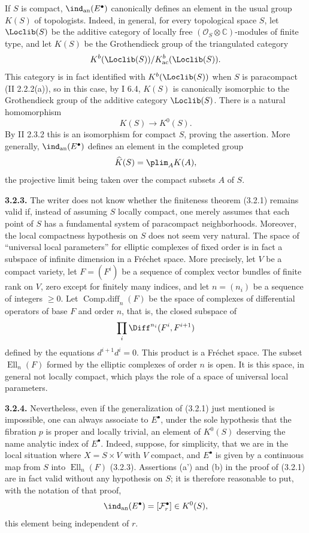 If $S$ is compact, $\ind_{\mathrm{an}}(E^\bullet)$ canonically defines an element in the usual group $K(S)$ of topologists. Indeed, in general, for every topological space $S$, let $\Loclib(S)$ be the additive category of locally free $(\mathcal O_S\otimes\mathbb C)$-modules of finite type, and let $K(S)$ be the Grothendieck group of the triangulated category
\[
 K^b(\Loclib(S))/K^b_{\mathrm{ac}}(\Loclib(S)).
\]
This category is in fact identified with $K^b(\Loclib(S))$ when $S$ is paracompact (II 2.2.2(a)), so in this case, by I 6.4, $K(S)$ is canonically isomorphic to the Grothendieck group of the additive category $\Loclib(S)$. There is a natural homomorphism
\[
 K(S)\longrightarrow K^0(S).
\]
By II 2.3.2 this is an isomorphism for compact $S$, proving the assertion. More generally, $\ind_{\mathrm{an}}(E^\bullet)$ defines an element in the completed group
\[
 \widehat K(S)=\plim_A K(A),
\]
the projective limit being taken over the compact subsets $A$ of $S$.

\textbf{3.2.3.} The writer does not know whether the finiteness theorem (3.2.1) remains valid if, instead of assuming $S$ locally compact, one merely assumes that each point of $S$ has a fundamental system of paracompact neighborhoods. Moreover, the local compactness hypothesis on $S$ does not seem very natural. The space of ``universal local parameters'' for elliptic complexes of fixed order is in fact a subspace of infinite dimension in a Fréchet space. More precisely, let $V$ be a compact variety, let $F=(F^i)$ be a sequence of complex vector bundles of finite rank on $V$, zero except for finitely many indices, and let $n=(n_i)$ be a sequence of integers $\ge0$. Let $\operatorname{Comp.diff}_n(F)$ be the space of complexes of differential operators of base $F$ and order $n$, that is, the closed subspace of
\[
 \prod_i \Diff^{n_i}(F^i,F^{i+1})
\]
defined by the equations $d^{i+1}d^i=0$. This product is a Fréchet space. The subset $\operatorname{Ell}_n(F)$ formed by the elliptic complexes of order $n$ is open. It is this space, in general not locally compact, which plays the role of a space of universal local parameters.

\textbf{3.2.4.} Nevertheless, even if the generalization of (3.2.1) just mentioned is impossible, one can always associate to $E^\bullet$, under the sole hypothesis that the fibration $p$ is proper and locally trivial, an element of $K^0(S)$ deserving the name analytic index of $E^\bullet$. Indeed, suppose, for simplicity, that we are in the local situation where $X=S\times V$ with $V$ compact, and $E^\bullet$ is given by a continuous map from $S$ into $\operatorname{Ell}_n(F)$ (3.2.3). Assertions (a') and (b) in the proof of (3.2.1) are in fact valid without any hypothesis on $S$; it is therefore reasonable to put, with the notation of that proof,
\[
 \ind_{\mathrm{an}}(E^\bullet)=[\mathcal F_r^\bullet]\in K^0(S),
\]
this element being independent of $r$.


